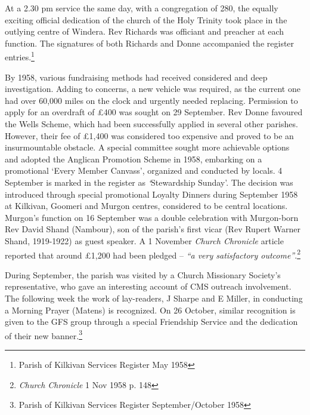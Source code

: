 At a 2.30 pm service the same day, with a congregation of 280, the equally exciting official dedication of the church of the Holy Trinity took place in the outlying centre of Windera. Rev Richards was officiant and preacher at each function. The signatures of both Richards and Donne accompanied the register entries.\footnote{Parish of Kilkivan Services Register May 1958}


By 1958, various fundraising methods had received considered and deep investigation. Adding to concerns, a new vehicle was required, as the current one had over 60,000 miles on the clock and urgently needed replacing. Permission to apply for an overdraft of \pounds400 was sought on 29 September. Rev Donne favoured the Wells Scheme, which had been successfully applied in several other parishes. However, their fee of \pounds1,400 was considered too expensive and proved to be an insurmountable obstacle. A special committee sought more achievable options and adopted the Anglican Promotion Scheme in 1958, embarking on a promotional `Every Member Canvass', organized and conducted by locals. 4 September is marked in the register as \emph{`}Stewardship Sunday'. The decision was introduced through special promotional Loyalty Dinners during September 1958 at Kilkivan, Goomeri and Murgon centres, considered to be central locations. Murgon's function on 16 September was a double celebration with Murgon-born Rev David Shand (Nambour), son of the parish's first vicar (Rev Rupert Warner Shand, 1919-1922) as guest speaker. A 1 November \emph{Church Chronicle} article reported that around \pounds1,200 had been pledged -- \emph{``a very satisfactory outcome''}.\footnote{\emph{Church Chronicle} 1 Nov 1958 p. 148}


During September, the parish was visited by a Church Missionary Society's representative, who gave an interesting account of CMS outreach involvement. The following week the work of lay-readers, J Sharpe and E Miller, in conducting a Morning Prayer (Matens) is recognized. On 26 October, similar recognition is given to the GFS group through a special Friendship Service and the dedication of their new banner.\footnote{Parish of Kilkivan Services Register September/October 1958}








